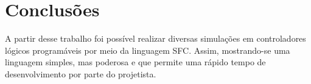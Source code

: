\section{Conclusões}


A partir desse trabalho foi possível realizar diversas simulações em controladores lógicos programáveis por meio da linguagem SFC. Assim, mostrando-se uma linguagem simples, mas poderosa e que permite uma rápido tempo de desenvolvimento por parte do projetista.